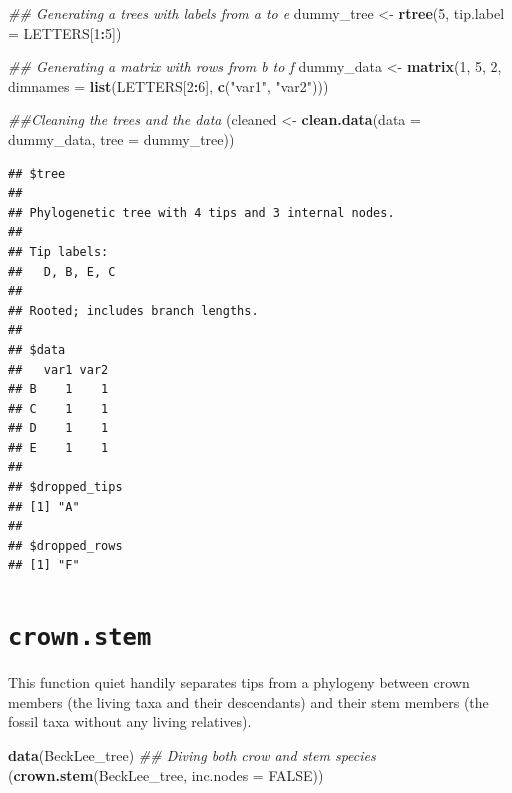 \documentclass[
]{book}
\newenvironment{Shaded}{\begin{snugshade}}{\end{snugshade}}
\newcommand{\CommentTok}[1]{\textcolor[rgb]{0.56,0.35,0.01}{\textit{#1}}}
\newcommand{\DataTypeTok}[1]{\textcolor[rgb]{0.13,0.29,0.53}{#1}}
\newcommand{\DecValTok}[1]{\textcolor[rgb]{0.00,0.00,0.81}{#1}}
\newcommand{\KeywordTok}[1]{\textcolor[rgb]{0.13,0.29,0.53}{\textbf{#1}}}
\newcommand{\NormalTok}[1]{#1}
\newcommand{\OperatorTok}[1]{\textcolor[rgb]{0.81,0.36,0.00}{\textbf{#1}}}
\newcommand{\OtherTok}[1]{\textcolor[rgb]{0.56,0.35,0.01}{#1}}
\newcommand{\StringTok}[1]{\textcolor[rgb]{0.31,0.60,0.02}{#1}}
\begin{document}
\begin{Shaded}
\begin{Highlighting}[]
\CommentTok{\#\# Generating a trees with labels from a to e}
\NormalTok{dummy\_tree \textless{}{-}}\StringTok{ }\KeywordTok{rtree}\NormalTok{(}\DecValTok{5}\NormalTok{, }\DataTypeTok{tip.label =}\NormalTok{ LETTERS[}\DecValTok{1}\OperatorTok{:}\DecValTok{5}\NormalTok{])}

\CommentTok{\#\# Generating a matrix with rows from b to f}
\NormalTok{dummy\_data \textless{}{-}}\StringTok{ }\KeywordTok{matrix}\NormalTok{(}\DecValTok{1}\NormalTok{, }\DecValTok{5}\NormalTok{, }\DecValTok{2}\NormalTok{, }\DataTypeTok{dimnames =} \KeywordTok{list}\NormalTok{(LETTERS[}\DecValTok{2}\OperatorTok{:}\DecValTok{6}\NormalTok{], }\KeywordTok{c}\NormalTok{(}\StringTok{"var1"}\NormalTok{, }\StringTok{"var2"}\NormalTok{)))}

\CommentTok{\#\#Cleaning the trees and the data}
\NormalTok{(cleaned \textless{}{-}}\StringTok{ }\KeywordTok{clean.data}\NormalTok{(}\DataTypeTok{data =}\NormalTok{ dummy\_data, }\DataTypeTok{tree =}\NormalTok{ dummy\_tree))}
\end{Highlighting}
\end{Shaded}

\begin{verbatim}
## $tree
## 
## Phylogenetic tree with 4 tips and 3 internal nodes.
## 
## Tip labels:
##   D, B, E, C
## 
## Rooted; includes branch lengths.
## 
## $data
##   var1 var2
## B    1    1
## C    1    1
## D    1    1
## E    1    1
## 
## $dropped_tips
## [1] "A"
## 
## $dropped_rows
## [1] "F"
\end{verbatim}

\hypertarget{crown.stem}{%
\section{\texorpdfstring{\texttt{crown.stem}}{crown.stem}}\label{crown.stem}}

This function quiet handily separates tips from a phylogeny between crown members (the living taxa and their descendants) and their stem members (the fossil taxa without any living relatives).

\begin{Shaded}
\begin{Highlighting}[]
\KeywordTok{data}\NormalTok{(BeckLee\_tree)}
\CommentTok{\#\# Diving both crow and stem species}
\NormalTok{(}\KeywordTok{crown.stem}\NormalTok{(BeckLee\_tree, }\DataTypeTok{inc.nodes =} \OtherTok{FALSE}\NormalTok{))}
\end{Highlighting}
\end{Shaded}
\end{document}
